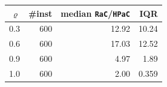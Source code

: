 \begin{tabular}{@{}rrrr@{}}
\toprule
$\varrho$ & \#inst & median \texttt{RaC}/\texttt{HPaC} & IQR \\
\midrule
0.3 & 600 & 12.92 & 10.24 \\
0.6 & 600 & 17.03 & 12.52 \\
0.9 & 600 & 4.97 & 1.89 \\
1.0 & 600 & 2.00 & 0.359 \\
\bottomrule
\end{tabular}
